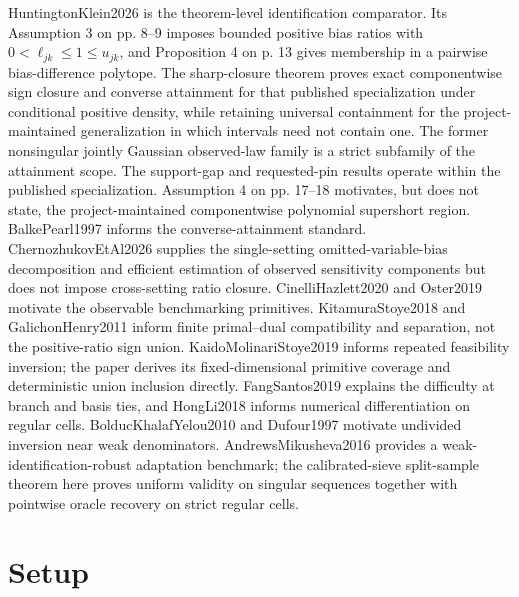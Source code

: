 \documentclass{article}
\begin{document}
HuntingtonKlein2026 is the theorem-level identification comparator.  Its Assumption 3 on pp. 8--9 imposes bounded positive bias ratios with \(0<\ell_{jk}\le1\le u_{jk}\), and Proposition 4 on p. 13 gives membership in a pairwise bias-difference polytope.  The sharp-closure theorem proves exact componentwise sign closure and converse attainment for that published specialization under conditional positive density, while retaining universal containment for the project-maintained generalization in which intervals need not contain one.  The former nonsingular jointly Gaussian observed-law family is a strict subfamily of the attainment scope.  The support-gap and requested-pin results operate within the published specialization.  Assumption 4 on pp. 17--18 motivates, but does not state, the project-maintained componentwise polynomial supershort region.  BalkePearl1997 informs the converse-attainment standard.  ChernozhukovEtAl2026 supplies the single-setting omitted-variable-bias decomposition and efficient estimation of observed sensitivity components but does not impose cross-setting ratio closure.  CinelliHazlett2020 and Oster2019 motivate the observable benchmarking primitives.  KitamuraStoye2018 and GalichonHenry2011 inform finite primal--dual compatibility and separation, not the positive-ratio sign union.  KaidoMolinariStoye2019 informs repeated feasibility inversion; the paper derives its fixed-dimensional primitive coverage and deterministic union inclusion directly.  FangSantos2019 explains the difficulty at branch and basis ties, and HongLi2018 informs numerical differentiation on regular cells.  BolducKhalafYelou2010 and Dufour1997 motivate undivided inversion near weak denominators.  AndrewsMikusheva2016 provides a weak-identification-robust adaptation benchmark; the calibrated-sieve split-sample theorem here proves uniform validity on singular sequences together with pointwise oracle recovery on strict regular cells.

\section{Setup}
\end{document}
